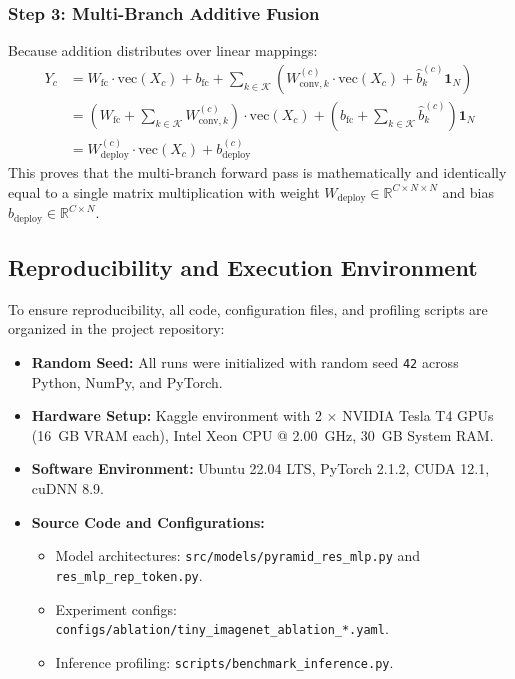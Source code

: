 \subsubsection{Step 3: Multi-Branch Additive Fusion}
Because addition distributes over linear mappings:
\begin{align}
    Y_c &= W_{\text{fc}} \cdot \text{vec}(X_c) + b_{\text{fc}} + \sum_{k \in \mathcal{K}} \left( W_{\text{conv}, k}^{(c)} \cdot \text{vec}(X_c) + \widehat{b}_k^{(c)} \mathbf{1}_N \right) \\
        &= \left( W_{\text{fc}} + \sum_{k \in \mathcal{K}} W_{\text{conv}, k}^{(c)} \right) \cdot \text{vec}(X_c) + \left( b_{\text{fc}} + \sum_{k \in \mathcal{K}} \widehat{b}_k^{(c)} \right) \mathbf{1}_N \\
        &= W_{\text{deploy}}^{(c)} \cdot \text{vec}(X_c) + b_{\text{deploy}}^{(c)}
\end{align}
This proves that the multi-branch forward pass is mathematically and identically equal to a single matrix multiplication with weight $W_{\text{deploy}} \in \mathbb{R}^{C \times N \times N}$ and bias $b_{\text{deploy}} \in \mathbb{R}^{C \times N}$.

\subsection{Reproducibility and Execution Environment}
\label{appendix:reproducibility}
To ensure reproducibility, all code, configuration files, and profiling scripts are organized in the project repository:
\begin{itemize}
    \item \textbf{Random Seed:} All runs were initialized with random seed \texttt{42} across Python, NumPy, and PyTorch.
    \item \textbf{Hardware Setup:} Kaggle environment with 2 $\times$ NVIDIA Tesla T4 GPUs (16~GB VRAM each), Intel Xeon CPU @ 2.00~GHz, 30~GB System RAM.
    \item \textbf{Software Environment:} Ubuntu 22.04 LTS, PyTorch 2.1.2, CUDA 12.1, cuDNN 8.9.
    \item \textbf{Source Code and Configurations:}
    \begin{itemize}
        \item Model architectures: \texttt{src/models/pyramid\_res\_mlp.py} and \texttt{res\_mlp\_rep\_token.py}.
        \item Experiment configs: \texttt{configs/ablation/tiny\_imagenet\_ablation\_*.yaml}.
        \item Inference profiling: \texttt{scripts/benchmark\_inference.py}.
    \end{itemize}
\end{itemize}
